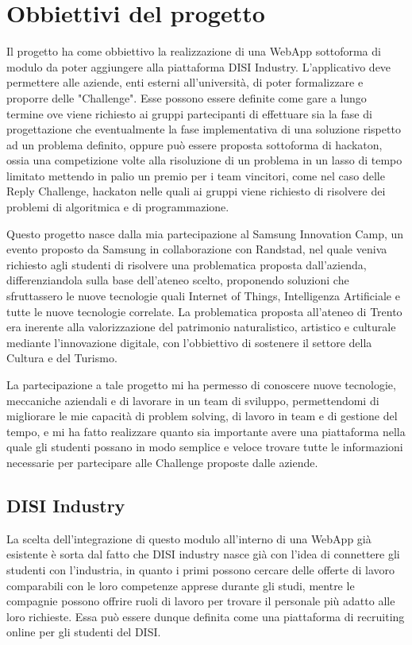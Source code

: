 \chapter{Obbiettivi del progetto}
\label{cha:intro}
Il progetto ha come obbiettivo la realizzazione di una WebApp sottoforma di modulo da poter aggiungere alla piattaforma DISI Industry. L'applicativo deve permettere alle aziende, enti esterni all'università, di poter formalizzare e proporre delle "Challenge". Esse possono essere definite come gare a lungo termine ove viene richiesto ai gruppi partecipanti di effettuare sia la fase di progettazione che eventualmente la fase implementativa di una soluzione rispetto ad un problema definito, oppure può essere proposta sottoforma di hackaton, ossia una competizione volte alla risoluzione di un problema in un lasso di tempo limitato mettendo in palio un premio per i team vincitori, come nel caso delle Reply Challenge, hackaton nelle quali ai gruppi viene richiesto di risolvere dei problemi di algoritmica e di programmazione. 

Questo progetto nasce dalla mia partecipazione al Samsung Innovation Camp, un evento proposto da Samsung in collaborazione con Randstad, nel quale veniva richiesto agli studenti di risolvere una problematica proposta dall'azienda, differenziandola sulla base dell'ateneo scelto, proponendo soluzioni che sfruttassero le nuove tecnologie quali Internet of Things, Intelligenza Artificiale e tutte le nuove tecnologie correlate. La problematica proposta all'ateneo di Trento era inerente alla valorizzazione del patrimonio naturalistico, artistico e culturale mediante l'innovazione digitale, con l'obbiettivo di sostenere il settore della Cultura e del Turismo.

La partecipazione a tale progetto mi ha permesso di conoscere nuove tecnologie, meccaniche aziendali e di lavorare in un team di sviluppo, permettendomi di migliorare le mie capacità di problem solving, di lavoro in team e di gestione del tempo, e mi ha fatto realizzare quanto sia importante avere una piattaforma nella quale gli studenti possano in modo semplice e veloce trovare tutte le informazioni necessarie per partecipare alle Challenge proposte dalle aziende.



\section{DISI Industry}
\label{sec:context}
La scelta dell'integrazione di questo modulo all'interno di una WebApp già esistente è sorta dal fatto che DISI industry nasce già con l'idea di connettere gli studenti con l'industria, in quanto i primi possono cercare delle offerte di lavoro comparabili con le loro competenze apprese durante gli studi, mentre le compagnie possono offrire ruoli di lavoro per trovare il personale più adatto alle loro richieste. Essa può essere dunque definita come una piattaforma di recruiting online per gli studenti del DISI. \cite{industry}

